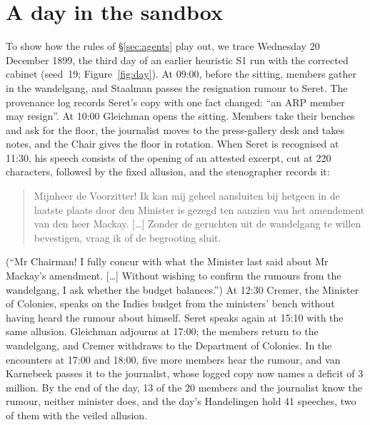 \documentclass[sigconf,review,anonymous]{acmart}
\begin{document}
\section{A day in the sandbox}
\label{app:day}
To show how the rules of \S\ref{sec:agents} play out, we trace Wednesday 20 December 1899, the third day of an earlier heuristic S1
run with the corrected cabinet (seed~19; Figure~\ref{fig:day}). At 09:00, before the sitting, members gather in the
wandelgang, and Staalman passes the resignation rumour to Seret. The
provenance log records Seret's copy with one fact changed: ``an ARP
member may resign''. At 10:00 Gleichman opens the sitting. Members take
their benches and ask for the floor, the journalist moves to the
press-gallery desk and takes notes, and the Chair gives the floor in
rotation. When Seret is recognised at 11:30, his speech consists of the
opening of an attested excerpt, cut at 220 characters, followed by the
fixed allusion, and the stenographer records it:
\begin{quote}\small
Mijnheer de Voorzitter! Ik kan mij geheel aansluiten bij hetgeen in de
laatste plaats door den Minister is gezegd ten aanzien vau het amendement
van den heer Mackay. [\ldots] Zonder de geruchten uit de wandelgang te
willen bevestigen, vraag ik of de begrooting sluit.
\end{quote}
(``Mr Chairman! I fully concur with what the Minister last said about
Mr Mackay's amendment. [\ldots] Without wishing to confirm the rumours
from the wandelgang, I ask whether the budget balances.'') At 12:30
Cremer, the Minister of Colonies, speaks on the Indies budget from the
ministers' bench without having heard the rumour about himself. Seret
speaks again at 15:10 with the same allusion. Gleichman adjourns at
17:00; the members return to the wandelgang, and Cremer withdraws to the
Department of Colonies. In the encounters at 17:00 and 18:00, five more
members hear the rumour, and van Karnebeek passes it to the journalist,
whose logged copy now names a deficit of 3 million. By the end of the day,
13 of the 20 members and the journalist know the rumour, neither minister
does, and the day's Handelingen hold 41 speeches, two of them with the
veiled allusion.
\end{document}

